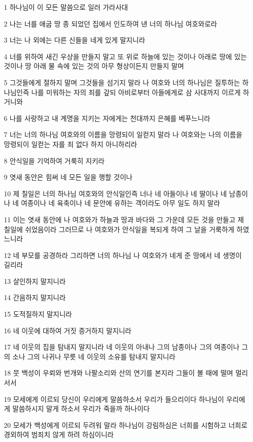 \par 1 하나님이 이 모든 말씀으로 일러 가라사대
\par 2 나는 너를 애굽 땅 종 되었던 집에서 인도하여 낸 너의 하나님 여호와로라
\par 3 너는 나 외에는 다른 신들을 네게 있게 말지니라
\par 4 너를 위하여 새긴 우상을 만들지 말고 또 위로 하늘에 있는 것이나 아래로 땅에 있는 것이나 땅 아래 물 속에 있는 것의 아무 형상이든지 만들지 말며
\par 5 그것들에게 절하지 말며 그것들을 섬기지 말라 나 여호와 너의 하나님은 질투하는 하나님인즉 나를 미워하는 자의 죄를 갚되 아비로부터 아들에게로 삼 사대까지 이르게 하거니와
\par 6 나를 사랑하고 내 계명을 지키는 자에게는 천대까지 은혜를 베푸느니라
\par 7 너는 너의 하나님 여호와의 이름을 망령되이 일컫지 말라 나 여호와는 나의 이름을 망령되이 일컫는 자를 죄 없다 하지 아니하리라
\par 8 안식일을 기억하여 거룩히 지키라
\par 9 엿새 동안은 힘써 네 모든 일을 행할 것이나
\par 10 제 칠일은 너의 하나님 여호와의 안식일인즉 너나 네 아들이나 네 딸이나 네 남종이나 네 여종이나 네 육축이나 네 문안에 유하는 객이라도 아무 일도 하지 말라
\par 11 이는 엿새 동안에 나 여호와가 하늘과 땅과 바다와 그 가운데 모든 것을 만들고 제 칠일에 쉬었음이라 그러므로 나 여호와가 안식일을 복되게 하여 그 날을 거룩하게 하였느니라
\par 12 네 부모를 공경하라 그리하면 너의 하나님 나 여호와가 네게 준 땅에서 네 생명이 길리라
\par 13 살인하지 말지니라
\par 14 간음하지 말지니라
\par 15 도적질하지 말지니라
\par 16 네 이웃에 대하여 거짓 증거하지 말지니라
\par 17 네 이웃의 집을 탐내지 말지니라 네 이웃의 아내나 그의 남종이나 그의 여종이나 그의 소나 그의 나귀나 무릇 네 이웃의 소유를 탐내지 말지니라
\par 18 뭇 백성이 우뢰와 번개와 나팔소리와 산의 연기를 본지라 그들이 볼 때에 떨며 멀리 서서
\par 19 모세에게 이르되 당신이 우리에게 말씀하소서 우리가 들으리이다 하나님이 우리에게 말씀하시지 말게 하소서 우리가 죽을까 하나이다
\par 20 모세가 백성에게 이르되 두려워 말라 하나님이 강림하심은 너희를 시험하고 너희로 경외하여 범죄치 않게 하려 하심이니라
